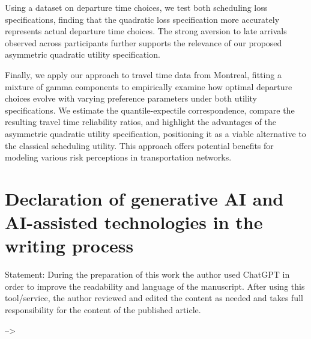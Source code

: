 \documentclass[preprint, 3p, authoryear]{elsarticle} %
\theoremstyle{definition}
\theoremstyle{definition}
\theoremstyle{definition}
\theoremstyle{definition}
\theoremstyle{remark}
\begin{document}
Using a dataset on departure time choices, we test both scheduling loss specifications, finding that the quadratic loss specification more accurately represents actual departure time choices. The strong aversion to late arrivals observed across participants further supports the relevance of our proposed asymmetric quadratic utility specification.

Finally, we apply our approach to travel time data from Montreal, fitting a mixture of gamma components to empirically examine how optimal departure choices evolve with varying preference parameters under both utility specifications. We estimate the quantile-expectile correspondence, compare the resulting travel time reliability ratios, and highlight the advantages of the asymmetric quadratic utility specification, positioning it as a viable alternative to the classical scheduling utility. This approach offers potential benefits for modeling various risk perceptions in transportation networks.

\hypertarget{declaration-of-generative-ai-and-ai-assisted-technologies-in-the-writing-process}{%
\section*{Declaration of generative AI and AI-assisted technologies in the writing process}\label{declaration-of-generative-ai-and-ai-assisted-technologies-in-the-writing-process}}

Statement: During the preparation of this work the author used ChatGPT in order to improve the readability and language of the manuscript. After using this tool/service, the author reviewed and edited the content as needed and takes full responsibility for the content of the published article.

--\textgreater{}


\end{document}
